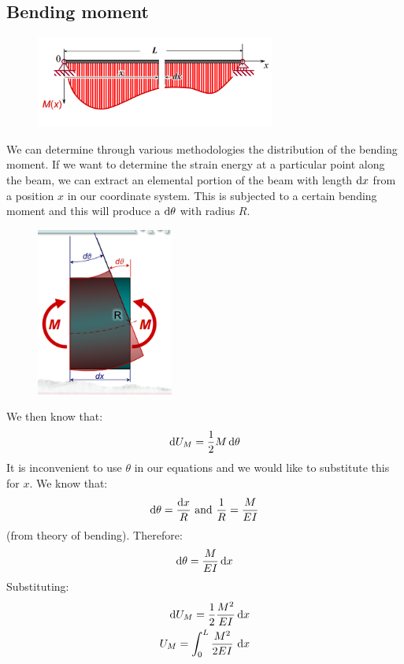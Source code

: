 \documentclass[class=report, crop=false, 12pt,a4paper]{standalone}
\begin{document}
\subsection{Bending moment}
\begin{figure}[H]
  \centering
  \includegraphics[width = 0.7\textwidth]{../img/diagram11.png}
  \caption{}
\end{figure}
We can determine through various methodologies the distribution of the bending moment. If we want to determine the strain energy at a particular point along the beam, we can extract an elemental portion of the beam with length $\dif x$ from a position $x$ in our coordinate system. This is subjected to a certain bending moment and this will produce a $\dif \theta$ with radius $R$.
\begin{figure}[H]
  \centering
  \includegraphics[width = 0.4\textwidth]{../img/diagram12.png}
  \caption{}
\end{figure}
We then know that:
\begin{equation}
  \dif U_M = \frac{1}{2} M \dif \theta
\end{equation}
It is inconvenient to use $\theta$ in our equations and we would like to substitute this for $x$. We know that:
\begin{align}
  \dif \theta = \frac{\dif x}{R} \textrm{ and } \frac{1}{R} = \frac{M}{EI}
\end{align}
(from theory of bending). Therefore:
\begin{equation}
  \dif \theta = \frac{M}{EI} \dif x
\end{equation}
Substituting:
\begin{align}
  \dif U_M = \frac{1}{2} \frac{M^2}{EI} \dif x\\
  U_M = \int_0^L \frac{M^2}{2EI}\, \dif x
\end{align}
\end{document}
